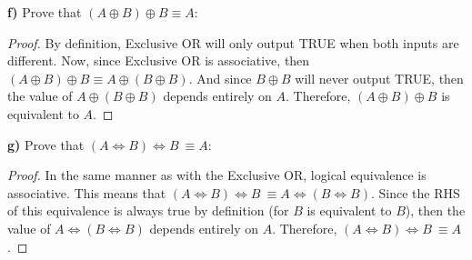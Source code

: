 \documentclass[titlepage, letterpaper, fleqn]{article}
\newcommand{\spacepls}{\vspace{5mm}}
\begin{document}
\spacepls

{\large \textbf{f)} Prove that \((A \oplus B) \oplus B \equiv A\):}

\begin{proof}
By definition, Exclusive OR will only output TRUE when both inputs are different.
Now, since Exclusive OR is associative, then \((A \oplus B) \oplus B \equiv A \oplus (B \oplus B)\).
And since \(B \oplus B\) will never output TRUE, then the value of \(A \oplus (B \oplus B)\) depends entirely on \(A\).
Therefore, \((A \oplus B) \oplus B\) is equivalent to \(A\).
\end{proof}

\spacepls

{\large \textbf{g)} Prove that \((A \iff B) \iff B\ \equiv A\):}

\begin{proof}
In the same manner as with the Exclusive OR, logical equivalence is associative. This means that \((A \iff B) \iff B\ \equiv A \iff (B \iff B)\).
Since the RHS of this equivalence is always true by definition (for \(B\) is equivalent to \(B\)), then the value of \(A \iff (B \iff B)\) depends entirely on \(A\).
Therefore, \((A \iff B) \iff B\ \equiv A\).
\end{proof}
\end{document}
